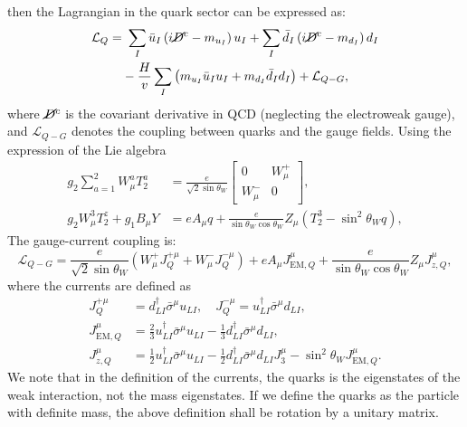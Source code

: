 then the Lagrangian in the quark sector can be expressed as:
\begin{equation}
\begin{aligned}
	\mathcal L_Q =&\ \sum_I \bar u_I\left(i\cancel D^c-m_{u_I}\right)u_I + \sum_I \bar d_I \left(i \cancel D^c-m_{d_I}\right)d_I \\
	& -\frac{H}{v} \sum_I\left(m_{u_I}\bar u_I u_I+m_{d_I}\bar d_I d_I \right) + \mathcal L_{Q-G},
\end{aligned}
\end{equation}
where $\cancel D^c$ is the covariant derivative in QCD (neglecting the electroweak gauge), and $\mathcal L_{Q-G}$ denotes the coupling between quarks and the gauge fields.
Using the expression of the Lie algebra
\begin{equation}
\begin{aligned}
	g_2 \sum_{a=1}^2 W^a_\mu T^a_2 &= \frac{e}{\sqrt{2}\sin{\theta_W}}\begin{bmatrix}
		0 & W_\mu^+ \\ W_\mu^- & 0
	\end{bmatrix}, \\
	g_2 W_\mu^3 T^z_2 + g_1 B_\mu Y
	&= e A_\mu q + \frac{e}{\sin{\theta_W}\cos{\theta_W}} Z_\mu \left(T_2^3 - \sin^2{\theta_W} q\right),
\end{aligned}
\end{equation}
The gauge-current coupling is:
\begin{equation}
	\mathcal L_{Q-G} = \frac{e}{\sqrt{2}\sin{\theta_W}} \left(W^{+}_\mu J_Q^{+\mu} + W^{-}_\mu J_Q^{-\mu} \right) + e A_\mu J^{\mu}_{\mathrm{EM},Q} + \frac{e}{\sin{\theta_W}\cos{\theta_W}} Z_\mu J^\mu_{z,Q},
\end{equation}
where the currents are defined as
\begin{equation}
\begin{aligned}
	J^{+\mu}_Q &= d_{LI}^\dagger \bar\sigma^\mu u_{LI}, \quad
	J^{-\mu}_Q = u_{LI}^\dagger \bar\sigma^\mu d_{LI}, \\
	J^\mu_{\mathrm{EM},Q} &= \frac{2}{3} u_{LI}^\dagger \bar\sigma^\mu u_{LI} - \frac{1}{3} d_{LI}^\dagger \bar\sigma^\mu d_{LI}, \\
	J_{z,Q}^\mu &= \frac{1}{2} u_{LI}^\dagger \bar\sigma^\mu u_{LI} - \frac{1}{2} d_{LI}^\dagger \bar\sigma^\mu d_{LI} J^\mu_3-\sin^2{\theta_W}J_{\mathrm{EM},Q}^\mu.
\end{aligned}
\end{equation}
We note that in the definition of the currents, the quarks is the eigenstates of the weak interaction, not the mass eigenstates.
If we define the quarks as the particle with definite mass, the above definition shall be rotation by a unitary matrix.


